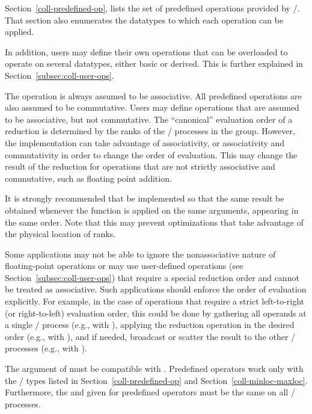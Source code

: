 Section~\ref{coll-predefined-op}, lists the set of predefined operations
provided by \MPI/. That section also enumerates
the datatypes
to which each operation can be applied.

In addition, users may define their own operations that can be
overloaded to operate on several datatypes, either basic or derived.
This is further explained in Section~\ref{subsec:coll-user-ops}.

The operation  is always assumed to be
associative.  All predefined operations are also assumed to be
commutative.  Users may define operations that are assumed to be
associative, but not commutative.  The ``canonical'' evaluation order
of a reduction is determined by the ranks of the \MPI/ processes in the
group.  However, the implementation can take
advantage of associativity, or associativity and commutativity
in order to change the order of evaluation.
This may change the result of the reduction for operations that are not
strictly associative and commutative, such as floating point addition.


\begin{implementors}
It is strongly recommended that  be implemented so
that the same result be obtained
whenever the function is applied on the same arguments,
appearing in the same order.  Note that this may
prevent optimizations that take
advantage of the physical location of ranks.
\end{implementors}

\begin{users}
Some applications may not be able to ignore the nonassociative nature of
floating-point operations or may use user-defined operations
(see Section~\ref{subsec:coll-user-ops}) that require a special reduction
order and cannot be treated as associative.
Such applications should enforce the order of evaluation explicitly.
For example, in the case of operations that require a strict left-to-right
(or right-to-left) evaluation order, this could be done by gathering all
operands at a single \MPI/ process (e.g., with ), applying the
reduction operation in the desired order (e.g., with ),
and if needed, broadcast or scatter the result to the other \MPI/ processes
(e.g., with ).
\end{users}

The  argument of  must be
compatible with
.
Predefined operators work only with
the \MPI/ types listed in Section~\ref{coll-predefined-op} and
Section~\ref{coll-minloc-maxloc}.  Furthermore, the
 and  given for predefined operators
must be the same on all \MPI/ processes.

